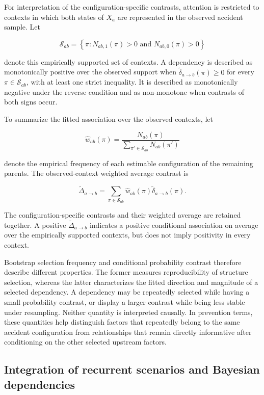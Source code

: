 For interpretation of the configuration-specific contrasts, attention is
restricted to contexts in which both states of \(X_a\) are represented in the
observed accident sample. Let

\[
\mathcal S_{ab}
=
\left\{
\pi:
N_{ab,1}(\pi)>0
\text{ and }
N_{ab,0}(\pi)>0
\right\}
\]

denote this empirically supported set of contexts. A dependency is described
as monotonically positive over the observed support when
\(\widetilde{\delta}_{a\rightarrow b}(\pi)\geq0\)
for every \(\pi\in\mathcal S_{ab}\), with at least one strict inequality.
It is described as monotonically negative under the reverse condition and as
non-monotone when contrasts of both signs occur.

To summarize the fitted association over the observed contexts, let

\[
\widehat w_{ab}(\pi)
=
\frac{
N_{ab}(\pi)
}{
\sum_{\pi'\in\mathcal S_{ab}}
N_{ab}(\pi')
}
\]

denote the empirical frequency of each estimable configuration of the
remaining parents. The observed-context weighted average contrast is

\[
\widetilde{\Delta}_{a\rightarrow b}
=
\sum_{\pi\in\mathcal S_{ab}}
\widehat w_{ab}(\pi)
\widetilde{\delta}_{a\rightarrow b}(\pi).
\]

The configuration-specific contrasts and their weighted average are retained
together. A positive
\(\widetilde{\Delta}_{a\rightarrow b}\)
indicates a positive conditional association on average over the empirically
supported contexts, but does not imply positivity in every context.

Bootstrap selection frequency and conditional probability contrast therefore
describe different properties. The former measures reproducibility of
structure selection, whereas the latter characterizes the fitted direction
and magnitude of a selected dependency. A dependency may be repeatedly
selected while having a small probability contrast, or display a larger
contrast while being less stable under resampling. Neither quantity is
interpreted causally. In prevention terms, these quantities help distinguish
factors that repeatedly belong to the same accident configuration from
relationships that remain directly informative after conditioning on the
other selected upstream factors.


\subsection{Integration of recurrent scenarios and Bayesian dependencies}
\label{sec:chap4_scenario_bn_integration}

